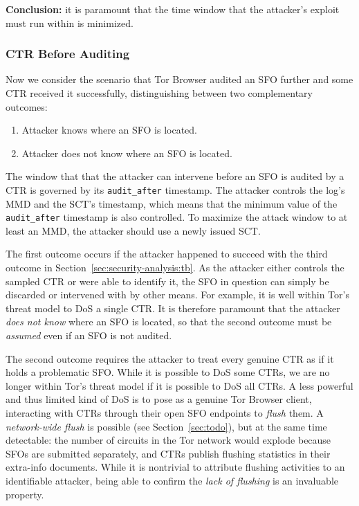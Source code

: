 \textbf{Conclusion:}
it is paramount that the time window that the attacker's exploit must run within
is minimized.

\subsubsection{CTR Before Auditing}
Now we consider the scenario that Tor Browser audited an SFO further and some
CTR received it successfully, distinguishing between two complementary outcomes:
\begin{enumerate}
	\item Attacker knows where an SFO is located.
	\item Attacker does not know where an SFO is located.
\end{enumerate}

The window that that the attacker can intervene before an SFO is audited by a
CTR is governed by its \texttt{audit\_after} timestamp.  The attacker controls
the log's MMD and the SCT's timestamp, which means that the minimum value of the
\texttt{audit\_after} timestamp is also controlled.  To maximize the attack
window to at least an MMD, the attacker should use a newly issued SCT.

The first outcome occurs if the attacker happened to succeed with the third
outcome in Section~\ref{sec:security-analysis:tb}.
As the attacker either controls the sampled CTR or were able to identify it,
the SFO in question can simply be discarded or intervened with by other means.
For example, it is well within Tor's threat model to DoS a single CTR.  It is
therefore paramount that the attacker \emph{does not know} where an SFO is
located, so that the second outcome must be \emph{assumed} even if an SFO is
not audited.

The second outcome requires the attacker to treat every genuine CTR as if it
holds a problematic SFO.  While it is possible to DoS some CTRs, we are no
longer within Tor's threat model if it is possible to DoS all CTRs.  A less
powerful and thus limited kind of DoS is to pose as a genuine Tor Browser
client, interacting with CTRs through their open SFO endpoints to \emph{flush}
them.  A \emph{network-wide flush} is possible (see Section~\ref{sec:todo}), but
at the same time detectable:
	the number of circuits in the Tor network would explode because SFOs
	are submitted separately, and
	CTRs publish flushing statistics in their extra-info documents.
While it is nontrivial to attribute flushing activities to an identifiable
attacker, being able to confirm the \emph{lack of flushing} is an invaluable
property.

